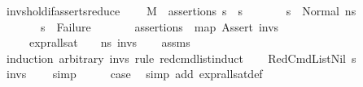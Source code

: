 \begin{isabellebody}
\begin{isamarkuptext}
\end{isamarkuptext}\isamarkuptrue%
\isamarkupfalse%
\ invs{\isacharunderscore}{\kern0pt}hold{\isacharunderscore}{\kern0pt}if{\isacharunderscore}{\kern0pt}asserts{\isacharunderscore}{\kern0pt}reduce{\isacharcolon}{\kern0pt}\ \isanewline
\ \ \ {\isachardoublequoteopen}M{\isacharcomma}{\kern0pt}{\isasymLambda}{\isacharcomma}{\kern0pt}{\isasymGamma}{\isacharcomma}{\kern0pt}{\isasymOmega}\ {\isasymturnstile}\ {\isasymlangle}assertions{\isacharcomma}{\kern0pt}\ s{}{\isasymrangle}\ {\isacharbrackleft}{\kern0pt}{\isasymrightarrow}{\isacharbrackright}{\kern0pt}\ s{}{\isachardoublequoteclose}\isanewline
\ \ \ \ \ \ \ {\isachardoublequoteopen}s{}\ {\isacharequal}{\kern0pt}\ Normal\ ns{}{\isachardoublequoteclose}\isanewline
\ \ \ \ \ \ \ {\isachardoublequoteopen}s{}\ {\isasymnoteq}\ Failure{\isachardoublequoteclose}\isanewline
\ \ \ \ \ \ \ {\isachardoublequoteopen}assertions\ {\isacharequal}{\kern0pt}\ map\ Assert\ invs{\isachardoublequoteclose}\isanewline
\ \ \ \ \ {\isachardoublequoteopen}expr{\isacharunderscore}{\kern0pt}all{\isacharunderscore}{\kern0pt}sat\ {\isasymLambda}\ {\isasymGamma}\ {\isasymOmega}\ ns{}\ invs{\isachardoublequoteclose}\isanewline
%
\isadelimproof
\ \ %
\endisadelimproof
%
\isatagproof
{}\isamarkupfalse%
\ assms\isanewline
{}\isamarkupfalse%
\ {\isacharparenleft}{\kern0pt}induction\ arbitrary{\isacharcolon}{\kern0pt}\ invs\ rule{\isacharcolon}{\kern0pt}\ red{\isacharunderscore}{\kern0pt}cmd{\isacharunderscore}{\kern0pt}list{\isachardot}{\kern0pt}induct{\isacharparenright}{\kern0pt}\isanewline
\ \ \isamarkupfalse%
\ {\isacharparenleft}{\kern0pt}RedCmdListNil\ s{\isacharparenright}{\kern0pt}\isanewline
\ \ \isamarkupfalse%
\ {\isachardoublequoteopen}invs\ {\isacharequal}{\kern0pt}\ {\isacharbrackleft}{\kern0pt}{\isacharbrackright}{\kern0pt}{\isachardoublequoteclose}\ \isamarkupfalse%
\ simp\isanewline
\ \ \isamarkupfalse%
\ \isamarkupfalse%
\ {\isacharquery}{\kern0pt}case\ \isamarkupfalse%
\ {\isacharparenleft}{\kern0pt}simp\ add{\isacharcolon}{\kern0pt}\ expr{\isacharunderscore}{\kern0pt}all{\isacharunderscore}{\kern0pt}sat{\isacharunderscore}{\kern0pt}def{\isacharparenright}{\kern0pt}\isanewline
{}\isamarkupfalse%
\isanewline
\ \ \isamarkupfalse%

\end{isabellebody}
